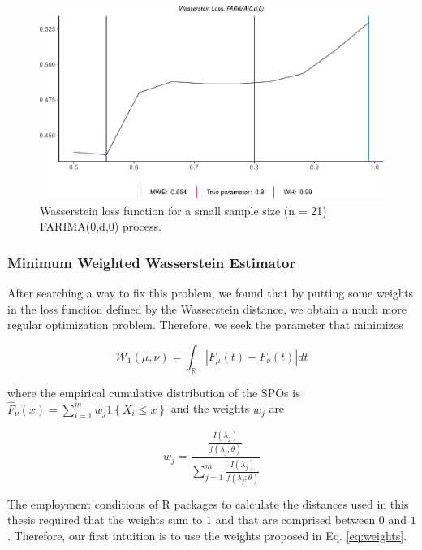 \documentclass[
  11pt,
]{article}
\begin{document}
\begin{figure}

{\centering \includegraphics[width=0.6\linewidth]{Master_thesis_V1_files/figure-latex/small_sample-1} 

}

\caption{Wasserstein loss function for a small sample size (n = 21) FARIMA(0,d,0) process.}\label{fig:small_sample}
\end{figure}

\hypertarget{minimum-weighted-wasserstein-estimator}{%
\subsubsection{Minimum Weighted Wasserstein
Estimator}\label{minimum-weighted-wasserstein-estimator}}

After searching a way to fix this problem, we found that by putting some
weights in the loss function defined by the Wasserstein distance, we
obtain a much more regular optimization problem. Therefore, we seek the
parameter that minimizes

\begin{equation}
\mathcal{W}_{1}(\mu, \nu)=\int_{\mathbb{R}}\left|F_{\mu}(t)-F_{\nu}(t)\right| d t
\end{equation}

where the empirical cumulative distribution of the SPOs is
\(\hat F_\nu(x)=\sum_{i=1}^{m} w_{j} 1\left\{X_{i} \leq x\right\}\) and
the weights \(w_j\) are

\begin{equation}
w_j = \frac{\frac{I(\lambda_j)}{f(\lambda_j; \theta)}}{\sum^m_{j = 1}\frac{I(\lambda_j)}{f(\lambda_j; \theta)}}
\label{eq:weights}
\end{equation}

The employment conditions of R packages to calculate the distances used
in this thesis required that the weights sum to \(1\) and that are
comprised between \(0\) and \(1\). Therefore, our first intuition is to
use the weights proposed in Eq. \ref{eq:weights}.
\end{document}
